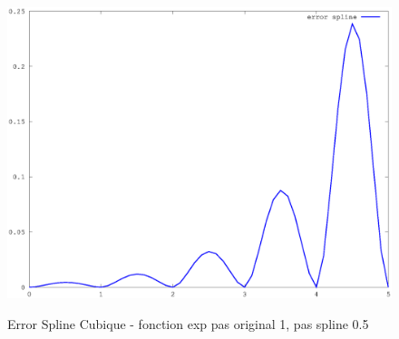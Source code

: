 \documentclass[a4paper,11pt]{article}
\begin{document}
\begin{figure}[h!]
  \begin{centering}
    \includegraphics[scale=0.5]{../exp_10_error}
    \label{rspro2}
    \par\end{centering}
  \caption{Error Spline Cubique - fonction exp pas original 1, pas spline 0.5}
  \label{fig:jacobi-conv}
\end{figure}
\end{document}
